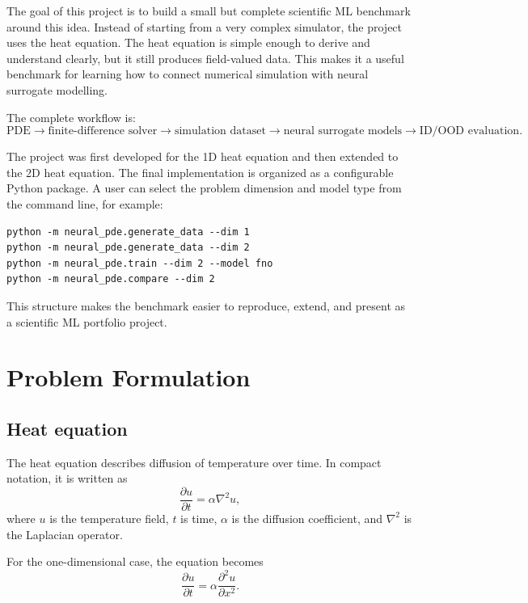 \documentclass[11pt,a4paper]{article}
\begin{document}
The goal of this project is to build a small but complete scientific ML benchmark around this idea. Instead of starting from a very complex simulator, the project uses the heat equation. The heat equation is simple enough to derive and understand clearly, but it still produces field-valued data. This makes it a useful benchmark for learning how to connect numerical simulation with neural surrogate modelling.

The complete workflow is:
\begin{equation}
    \text{PDE}
    \rightarrow
    \text{finite-difference solver}
    \rightarrow
    \text{simulation dataset}
    \rightarrow
    \text{neural surrogate models}
    \rightarrow
    \text{ID/OOD evaluation}.
\end{equation}

The project was first developed for the 1D heat equation and then extended to the 2D heat equation. The final implementation is organized as a configurable Python package. A user can select the problem dimension and model type from the command line, for example:
\begin{verbatim}
python -m neural_pde.generate_data --dim 1
python -m neural_pde.generate_data --dim 2
python -m neural_pde.train --dim 2 --model fno
python -m neural_pde.compare --dim 2
\end{verbatim}

This structure makes the benchmark easier to reproduce, extend, and present as a scientific ML portfolio project.

\section{Problem Formulation}

\subsection{Heat equation}

The heat equation describes diffusion of temperature over time. In compact notation, it is written as
\begin{equation}
    \frac{\partial u}{\partial t}
    =
    \alpha \nabla^2 u,
    \label{eq:heat_general}
\end{equation}
where \(u\) is the temperature field, \(t\) is time, \(\alpha\) is the diffusion coefficient, and \(\nabla^2\) is the Laplacian operator.

For the one-dimensional case, the equation becomes
\begin{equation}
    \frac{\partial u}{\partial t}
    =
    \alpha
    \frac{\partial^2 u}{\partial x^2}.
    \label{eq:heat_1d}
\end{equation}
\end{document}
